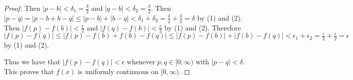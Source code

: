 \documentclass[10pt]{article}
\theoremstyle{definition}
\begin{document}
\begin{enumerate}
\begin{proof}
Then  $|p-b| < \delta_1 = \frac{\delta}{2}$ and $|q-b| < \delta_2 = \frac{\delta}{2}$.  Then $|p-q|= |p-b+b-q| \leq |p-b| + |b-q| < \delta_1 + \delta_2 = \frac{\delta}{2}+\frac{\delta}{2} = \delta$ by (1) and (2).  Then $|f(p)-f(b)| < \frac{\epsilon}{2}$ and $|f(q)-f(b)| < \frac{\epsilon}{2}$ by (1) and (2).  Therefore $|f(p)-f(q)| \leq |f(p)-f(b)+f(b)-f(q)| \leq |f(p)-f(b)| + |f(b)-f(q)| < \epsilon_1 + \epsilon_2 = \frac{\epsilon}{2}+\frac{\epsilon}{2} = \epsilon$ by (1) and (2).

Thus we have that $|f(p)-f(q)| < \epsilon$ whenever $p, q \in [0,\infty)$ with $|p-q| < \delta$.  This proves that $f(x)$ is uniformly continuous on $[0,\infty)$.

\end{proof}
	

\end{enumerate}
\end{document}
